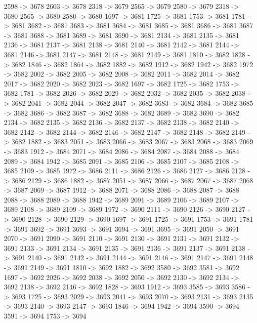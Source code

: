 {	2598 -> 3678
	2603 -> 3678
	2318 -> 3679
	2565 -> 3679
	2580 -> 3679
	2318 -> 3680
	2565 -> 3680
	2580 -> 3680
	1697 -> 3681
	1725 -> 3681
	1753 -> 3681
	1781 -> 3681
	3682 -> 3681
	3683 -> 3681
	3684 -> 3681
	3685 -> 3681
	3686 -> 3681
	3687 -> 3681
	3688 -> 3681
	3689 -> 3681
	3690 -> 3681
	2134 -> 3681
	2135 -> 3681
	2136 -> 3681
	2137 -> 3681
	2138 -> 3681
	2140 -> 3681
	2142 -> 3681
	2144 -> 3681
	2146 -> 3681
	2147 -> 3681
	2148 -> 3681
	2149 -> 3681
	1810 -> 3682
	1828 -> 3682
	1846 -> 3682
	1864 -> 3682
	1882 -> 3682
	1912 -> 3682
	1942 -> 3682
	1972 -> 3682
	2002 -> 3682
	2005 -> 3682
	2008 -> 3682
	2011 -> 3682
	2014 -> 3682
	2017 -> 3682
	2020 -> 3682
	2023 -> 3682
	1697 -> 3682
	1725 -> 3682
	1753 -> 3682
	1781 -> 3682
	2026 -> 3682
	2029 -> 3682
	2032 -> 3682
	2035 -> 3682
	2038 -> 3682
	2041 -> 3682
	2044 -> 3682
	2047 -> 3682
	3683 -> 3682
	3684 -> 3682
	3685 -> 3682
	3686 -> 3682
	3687 -> 3682
	3688 -> 3682
	3689 -> 3682
	3690 -> 3682
	2134 -> 3682
	2135 -> 3682
	2136 -> 3682
	2137 -> 3682
	2138 -> 3682
	2140 -> 3682
	2142 -> 3682
	2144 -> 3682
	2146 -> 3682
	2147 -> 3682
	2148 -> 3682
	2149 -> 3682
	1882 -> 3683
	2051 -> 3683
	2066 -> 3683
	2067 -> 3683
	2068 -> 3683
	2069 -> 3683
	1912 -> 3684
	2071 -> 3684
	2086 -> 3684
	2087 -> 3684
	2088 -> 3684
	2089 -> 3684
	1942 -> 3685
	2091 -> 3685
	2106 -> 3685
	2107 -> 3685
	2108 -> 3685
	2109 -> 3685
	1972 -> 3686
	2111 -> 3686
	2126 -> 3686
	2127 -> 3686
	2128 -> 3686
	2129 -> 3686
	1882 -> 3687
	2051 -> 3687
	2066 -> 3687
	2067 -> 3687
	2068 -> 3687
	2069 -> 3687
	1912 -> 3688
	2071 -> 3688
	2086 -> 3688
	2087 -> 3688
	2088 -> 3688
	2089 -> 3688
	1942 -> 3689
	2091 -> 3689
	2106 -> 3689
	2107 -> 3689
	2108 -> 3689
	2109 -> 3689
	1972 -> 3690
	2111 -> 3690
	2126 -> 3690
	2127 -> 3690
	2128 -> 3690
	2129 -> 3690
	1697 -> 3691
	1725 -> 3691
	1753 -> 3691
	1781 -> 3691
	3692 -> 3691
	3693 -> 3691
	3694 -> 3691
	3695 -> 3691
	2050 -> 3691
	2070 -> 3691
	2090 -> 3691
	2110 -> 3691
	2130 -> 3691
	2131 -> 3691
	2132 -> 3691
	2133 -> 3691
	2134 -> 3691
	2135 -> 3691
	2136 -> 3691
	2137 -> 3691
	2138 -> 3691
	2140 -> 3691
	2142 -> 3691
	2144 -> 3691
	2146 -> 3691
	2147 -> 3691
	2148 -> 3691
	2149 -> 3691
	1810 -> 3692
	1882 -> 3692
	3580 -> 3692
	3581 -> 3692
	1697 -> 3692
	2026 -> 3692
	2038 -> 3692
	2050 -> 3692
	2130 -> 3692
	2134 -> 3692
	2138 -> 3692
	2146 -> 3692
	1828 -> 3693
	1912 -> 3693
	3585 -> 3693
	3586 -> 3693
	1725 -> 3693
	2029 -> 3693
	2041 -> 3693
	2070 -> 3693
	2131 -> 3693
	2135 -> 3693
	2140 -> 3693
	2147 -> 3693
	1846 -> 3694
	1942 -> 3694
	3590 -> 3694
	3591 -> 3694
	1753 -> 3694
}
